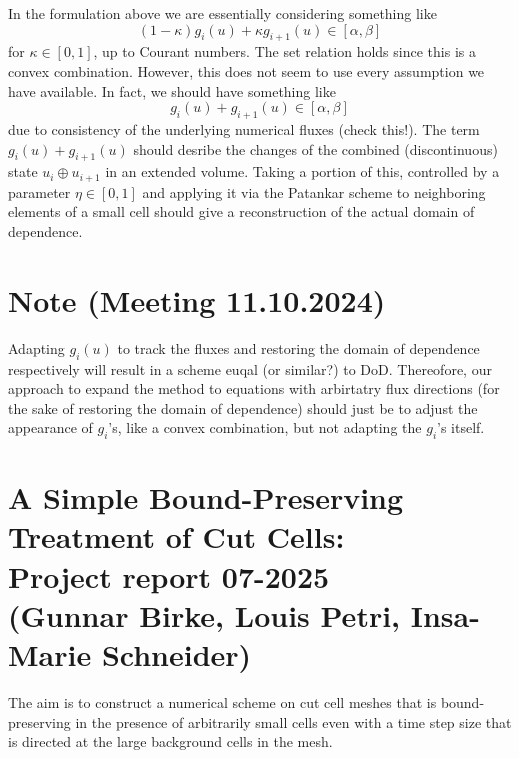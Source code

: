 \documentclass[]{article}
\begin{document}
In the formulation above we are essentially considering something like
\begin{displaymath}
(1-\kappa)g_i(u) + \kappa g_{i+1}(u) \in [\alpha, \beta]
\end{displaymath}
for $\kappa \in [0, 1]$, up to Courant numbers. The set relation holds since this is a convex combination. However, this does not seem to use every assumption we have available. In fact, we should have something like
\begin{displaymath}
	g_i(u) + g_{i+1}(u) \in [\alpha, \beta]
\end{displaymath}
due to consistency of the underlying numerical fluxes (check this!). The term $g_i(u) + g_{i+1}(u)$ should desribe  the changes of the combined (discontinuous) state $u_i \oplus u_{i+1}$ in an extended volume. Taking a portion of this, controlled by a parameter $\eta \in [0, 1]$ and applying it via the Patankar scheme to neighboring elements of a small cell should give a reconstruction of the actual domain of dependence.

\section{Note (Meeting 11.10.2024)}
Adapting $g_i(u)$ to track the fluxes and restoring the domain of dependence respectively will result in a scheme euqal (or similar?) to DoD. 
Thereofore, our approach to expand the method to equations with arbirtatry flux directions (for the sake of restoring the domain of dependence) should just be to adjust the appearance of $g_i$'s, like a convex combination, but not adapting the $g_i$'s itself.

\newpage
\thispagestyle{empty}
\section*{A Simple Bound-Preserving Treatment of
Cut Cells:\\
Project report 07-2025\\ (Gunnar Birke, Louis Petri, Insa-Marie Schneider)}
The aim is to construct a numerical scheme on cut cell meshes that is bound-preserving in the presence of arbitrarily small cells even with a time step size that is directed at the large background cells in the mesh.
\end{document}
